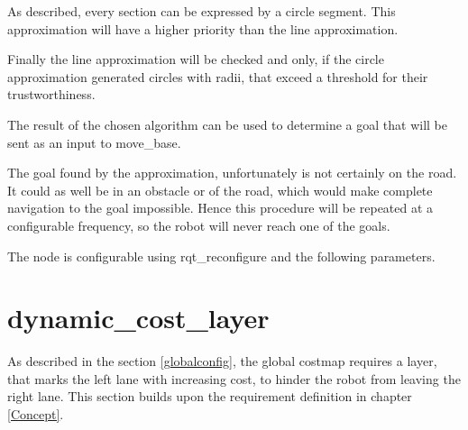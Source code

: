 As described, every section can be expressed by a circle segment. This approximation will have a higher priority than the line approximation.

Finally the line approximation will be checked and only, if the circle approximation generated circles with radii, that exceed a threshold for their trustworthiness.

The result of the chosen algorithm can be used to determine a goal that will be sent as an input to move\_base.

The goal found by the approximation, unfortunately is not certainly on the road. It could as well be in an obstacle or of the road, which would make complete navigation to the goal impossible. Hence this procedure will be repeated at a configurable frequency, so the robot will never reach one of the goals. 

The node is configurable using rqt\_reconfigure and the following parameters.

\begin{table}[H]
\centering
{}

\caption{PoseFinder parameters}
\label{posefinderparams}

\end{table}


\section{dynamic\_cost\_layer}
As described in the section \ref{globalconfig}, the global costmap requires a layer, that marks the left lane with increasing cost, to hinder the robot from leaving the right lane. This section builds upon the requirement definition in chapter \ref{Concept}.\\


